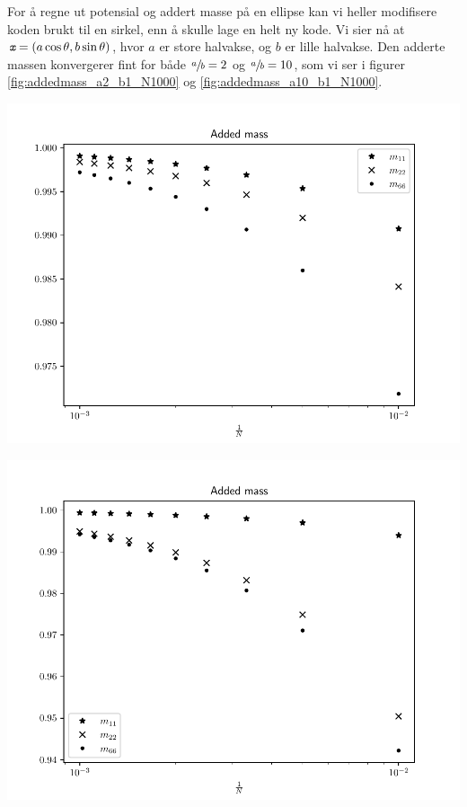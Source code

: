 For å regne ut potensial og addert masse på en ellipse kan vi heller modifisere koden brukt til en sirkel, enn å skulle lage en helt ny kode.
Vi sier nå at ${\textit{\texttt{x}}} = (a\cos{\theta}, b\sin{\theta})$, hvor $a$ er store halvakse, og $b$ er lille halvakse.
Den adderte massen konvergerer fint for både $\sfrac{a}{b} = 2$ og $\sfrac{a}{b} = 10$, som vi ser i figurer \ref{fig:addedmass_a2_b1_N1000} og \ref{fig:addedmass_a10_b1_N1000}.
\begin{Figure}
    \centering
    \captionsetup{type = figure}
    \includegraphics[width = \textwidth]{addedmass_a2_b1_N1000.pdf}
    \label{fig:addedmass_a2_b1_N1000}
\end{Figure}
\begin{Figure}
    \centering
    \captionsetup{type = figure}
    \includegraphics[width = \textwidth]{addedmass_a10_b1_N1000.pdf}
    \label{fig:addedmass_a10_b1_N1000}
\end{Figure}


